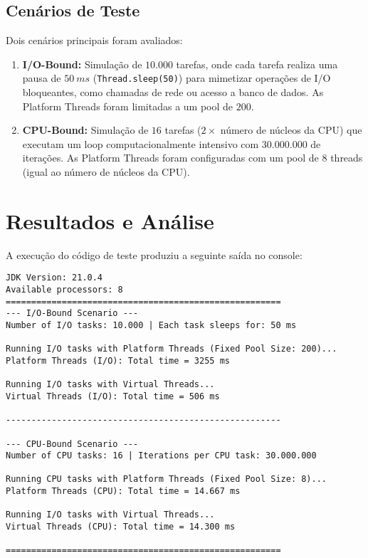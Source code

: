 \documentclass[12pt,a4paper]{article}
\begin{document}
\subsection{Cenários de Teste}
Dois cenários principais foram avaliados:
\begin{enumerate}
    \item \textbf{I/O-Bound:} Simulação de $10.000$ tarefas, onde cada tarefa realiza uma pausa de $50~ms$ (\texttt{Thread.sleep(50)}) para mimetizar operações de I/O bloqueantes, como chamadas de rede ou acesso a banco de dados. As Platform Threads foram limitadas a um pool de $200$.
    \item \textbf{CPU-Bound:} Simulação de $16$ tarefas ($2 \times$ número de núcleos da CPU) que executam um loop computacionalmente intensivo com $30.000.000$ de iterações. As Platform Threads foram configuradas com um pool de $8$ threads (igual ao número de núcleos da CPU).
\end{enumerate}

\section{Resultados e Análise}
A execução do código de teste produziu a seguinte saída no console:
\begin{verbatim}
JDK Version: 21.0.4
Available processors: 8
======================================================
--- I/O-Bound Scenario ---
Number of I/O tasks: 10.000 | Each task sleeps for: 50 ms

Running I/O tasks with Platform Threads (Fixed Pool Size: 200)...
Platform Threads (I/O): Total time = 3255 ms

Running I/O tasks with Virtual Threads...
Virtual Threads (I/O): Total time = 506 ms

------------------------------------------------------

--- CPU-Bound Scenario ---
Number of CPU tasks: 16 | Iterations per CPU task: 30.000.000

Running CPU tasks with Platform Threads (Fixed Pool Size: 8)...
Platform Threads (CPU): Total time = 14.667 ms

Running I/O tasks with Virtual Threads...
Virtual Threads (CPU): Total time = 14.300 ms

======================================================
\end{verbatim}
\end{document}
